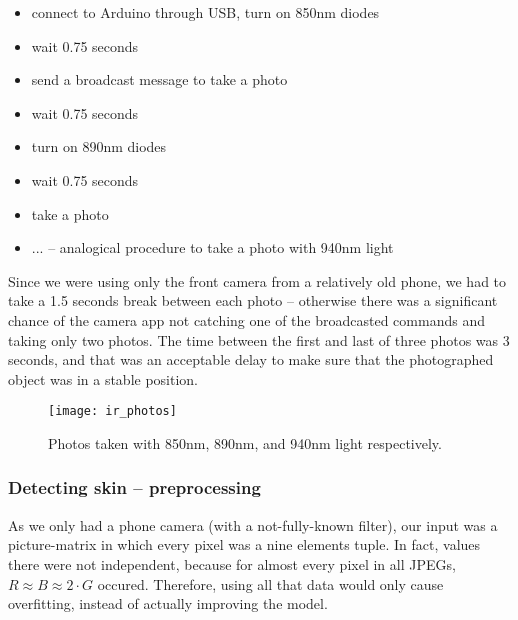            \begin{itemize}
                \item connect to Arduino through USB, turn on 850nm diodes
                \item wait 0.75 seconds
                \item send a broadcast message to take a photo
                \item wait 0.75 seconds
                \item turn on 890nm diodes
                \item wait 0.75 seconds
                \item take a photo
                \item ... -- analogical procedure to take a photo with 940nm light
            \end{itemize}

            Since we were using only the front camera from a relatively old phone,
            we had to take a 1.5 seconds break between each photo -- otherwise
            there was a significant chance of the camera app not catching one of the
            broadcasted commands and taking only two photos.
            The time between the first and last of three photos was 3 seconds,
            and that was an acceptable delay to make sure that the photographed
            object was in a stable position.

            \begin{figure}[H]
                \caption{Photos taken with 850nm, 890nm, and 940nm light respectively.}
                \centering
                \texttt{[image: ir\_photos]}
                \label{fig:ir_photos}
            \end{figure}

            \subsubsection*{Detecting skin -- preprocessing}
                As we only had a phone camera (with a not-fully-known filter),
                our input was a picture-matrix
                in which every pixel was a nine elements tuple.
                In fact, values there were not independent, because
                for almost every pixel in all JPEGs,
                $R \approx B \approx 2 \cdot G$ occured.
                Therefore, using all that data would only cause overfitting,
                instead of actually improving the model.

